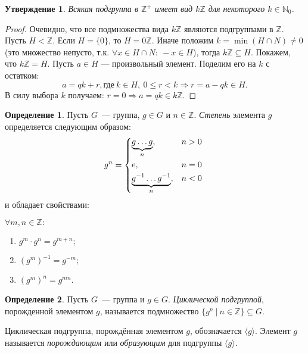 \documentclass[a4paper, 14pt]{extarticle}
\newcommand{\n}{\par}
\newcommand{\integers}{\mathbb{Z}}
\newcommand{\naturals}{\mathbb{N}}
\theoremstyle{definition}
\newtheorem{definition}{Определение}
\theoremstyle{plain}
\numberwithin{theorem}{section}
\numberwithin{definition}{section}
\newtheorem{statement}{Утверждение}
\numberwithin{statement}{section}
\numberwithin{lemma}{section}
\numberwithin{consequence}{section}
\begin{document}
	\begin{statement}
		Всякая подгруппа в $\integers ^ +$ имеет вид $k\integers$ для некоторого ${k \in \naturals_0}$.
	\end{statement}
	\begin{proof}
		Очевидно, что все подмножества вида $k\mathbb{Z}$ являются подгруппами в $\integers$.
		Пусть ${H < \integers}$. Если ${H = \{0\}}$, то ${H = 0\integers}$.
		Иначе положим ${k = \min(H \cap N) \neq 0}$ (это множество непусто, т.к. ${\forall x \in H \cap N{:} ~-x \in H}$), тогда ${k\integers \subseteq H}$.
		Покажем, что ${k\integers = H}$. Пусть ${a \in H}$ — произвольный элемент. Поделим его на $k$ с остатком:
		\begin{equation*}
			a = qk + r, \text{где} \ k \in H, \  
			0 \leqslant r < k \Rightarrow r = a - qk \in H.
		\end{equation*}
		В силу выбора $k$ получаем: ${r = 0 \Rightarrow a = qk \in k\integers}$.
	\end{proof}
	\begin{definition}
		Пусть $G$~--- группа, $g \in G$ и $n \in \integers$. \textit{Степень} элемента $g$ определяется следующим образом:
		\begin{equation*}
			g^{n}=
			\begin{cases*}
				\underbrace{g \mathellipsis g}_n,  &$n > 0$ \\
				e,  &$n = 0$ \\
				\underbrace{g^{-1} \mathellipsis g^{-1}}_n, &$n < 0$
			\end{cases*}
		\end{equation*}
		и обладает свойствами:\n
		$\forall m, n \in \integers:$
		\begin{enumerate}
			\setlength\itemsep{0.1em}
			\item $g^m \cdot g^n = g^{m+n};$
			\item $(g^m)^{-1} = g^{-m};$
			\item $(g^m)^n = g^{mn}.$
		\end{enumerate}
	\end{definition}
	\begin{definition}
		Пусть $G$~--- группа и $g \in G$. \textit{Циклической подгруппой}, порожденной элементом $g$, называется подмножество ${\{g^n \ | \ n \in \integers\} \subseteq G}$. \n
		Циклическая подгруппа, порождённая элементом $g$, обозначается $\langle g \rangle$. Элемент $g$ называется \textit{порождающим} или \textit{образующим} для подгруппы $\langle g \rangle$.
	\end{definition}
\end{document}
